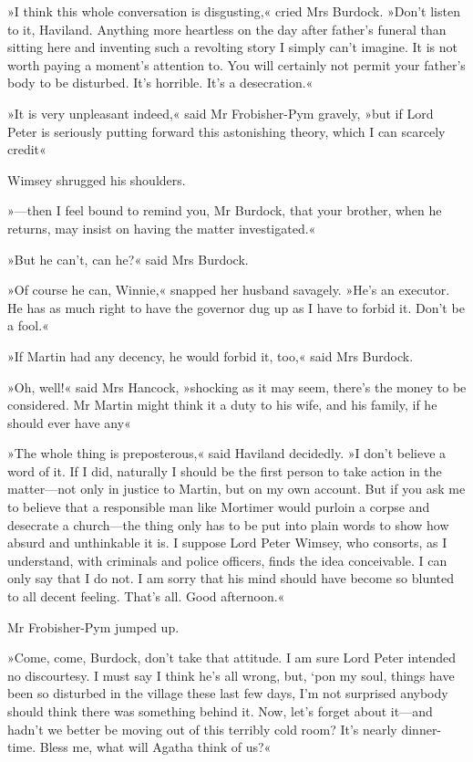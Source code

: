 »I think this whole conversation is disgusting,« cried Mrs Burdock. »Don't listen to it, Haviland. Anything more heartless on the day after father's funeral than sitting here and inventing such a revolting story I simply can't imagine. It is not worth paying a moment's attention to. You will certainly not permit your father's body to be disturbed. It's horrible. It's a desecration.«

»It is very unpleasant indeed,« said Mr Frobisher-Pym gravely, »but if Lord Peter is seriously putting forward this astonishing theory, which I can scarcely credit\longdash«

Wimsey shrugged his shoulders.

»—then I feel bound to remind you, Mr Burdock, that your brother, when he returns, may insist on having the matter investigated.«

»But he can't, can he?« said Mrs Burdock.

»Of course he can, Winnie,« snapped her husband savagely. »He's an executor. He has as much right to have the governor dug up as I have to forbid it. Don't be a fool.«

»If Martin had any decency, he would forbid it, too,« said Mrs Burdock.

»Oh, well!« said Mrs Hancock, »shocking as it may seem, there's the money to be considered. Mr Martin might think it a duty to his wife, and his family, if he should ever have any\longdash«

»The whole thing is preposterous,« said Haviland decidedly. »I don't believe a word of it. If I did, naturally I should be the first person to take action in the matter—not only in justice to Martin, but on my own account. But if you ask me to believe that a responsible man like Mortimer would purloin a corpse and desecrate a church—the thing only has to be put into plain words to show how absurd and unthinkable it is. I suppose Lord Peter Wimsey, who consorts, as I understand, with criminals and police officers, finds the idea conceivable. I can only say that I do not. I am sorry that his mind should have become so blunted to all decent feeling. That's all. Good afternoon.«

Mr Frobisher-Pym jumped up.

»Come, come, Burdock, don't take that attitude. I am sure Lord Peter intended no discourtesy. I must say I think he's all wrong, but, `pon my soul, things have been so disturbed in the village these last few days, I'm not surprised anybody should think there was something behind it. Now, let's forget about it—and hadn't we better be moving out of this terribly cold room? It's nearly dinner-time. Bless me, what will Agatha think of us?«

